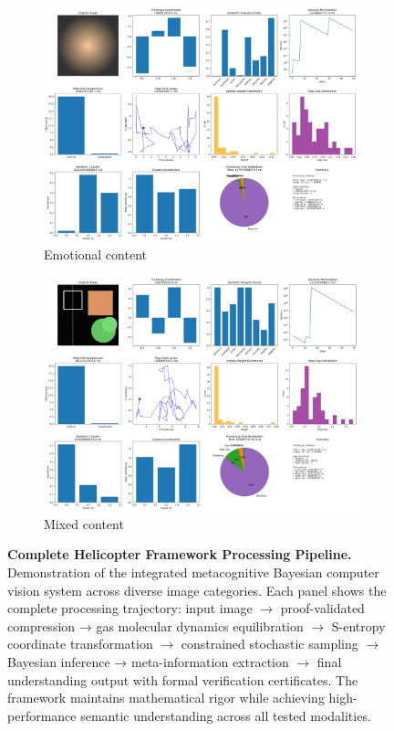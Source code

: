 \documentclass[11pt,a4paper]{article}
\begin{document}
\begin{figure}[htbp]
\begin{subfigure}{0.48\textwidth}
\includegraphics[width=\textwidth]{helicopter/demos/helicopter_demo_emotional_complete.png}
\caption{Emotional content}
\end{subfigure}
\hfill
\begin{subfigure}{0.48\textwidth}
\includegraphics[width=\textwidth]{helicopter/demos/helicopter_demo_mixed_complete.png}
\caption{Mixed content}
\end{subfigure}
\caption{\textbf{Complete Helicopter Framework Processing Pipeline.} Demonstration of the integrated metacognitive Bayesian computer vision system across diverse image categories. Each panel shows the complete processing trajectory: input image  $\rightarrow$ proof-validated compression → gas molecular dynamics equilibration  $\rightarrow$ S-entropy coordinate transformation  $\rightarrow$ constrained stochastic sampling $\rightarrow$ Bayesian inference → meta-information extraction  $\rightarrow$ final understanding output with formal verification certificates. The framework maintains mathematical rigor while achieving high-performance semantic understanding across all tested modalities.}
\label{fig:helicopter-complete-system}
\end{figure}
\end{document}
